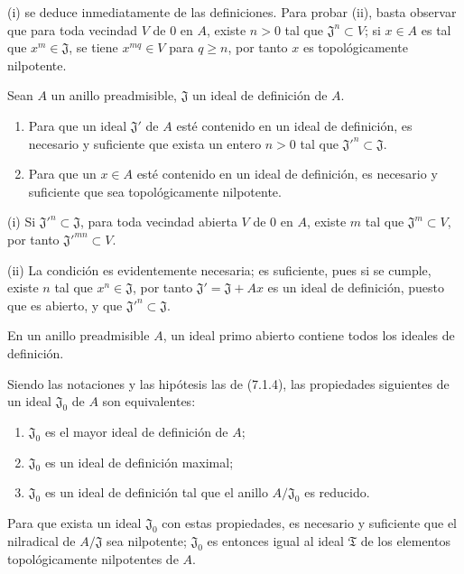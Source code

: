 (i) se deduce inmediatamente de las definiciones. Para probar (ii), basta
observar que para toda vecindad $V$ de $0$ en $A$, existe $n>0$ tal que
$\mathfrak J^n\subset V$; si $x\in A$ es tal que $x^m\in\mathfrak J$, se tiene
$x^{mq}\in V$ para $q\geq n$, por tanto $x$ es topológicamente nilpotente.

\begin{proposition}[7.1.4]
\label{0.7.1.4-fr}
Sean $A$ un anillo preadmisible, $\mathfrak J$ un ideal de definición de
$A$.
\begin{enumerate}
  \item[{\upshape(i)}] Para que un ideal $\mathfrak J'$ de $A$ esté contenido
    en un ideal de definición, es necesario y suficiente que exista un entero
    $n>0$ tal que ${\mathfrak J'}^n\subset\mathfrak J$.
  \item[{\upshape(ii)}] Para que un $x\in A$ esté contenido en un ideal de
    definición, es necesario y suficiente que sea topológicamente nilpotente.
\end{enumerate}
\end{proposition}

(i) Si ${\mathfrak J'}^n\subset\mathfrak J$, para toda vecindad abierta $V$ de
$0$ en $A$, existe $m$ tal que $\mathfrak J^m\subset V$, por tanto
${\mathfrak J'}^{mn}\subset V$.

(ii) La condición es evidentemente necesaria; es suficiente, pues si se
cumple, existe $n$ tal que $x^n\in\mathfrak J$, por tanto
$\mathfrak J'=\mathfrak J+Ax$ es un ideal de definición, puesto que es abierto,
y que ${\mathfrak J'}^n\subset\mathfrak J$.

\begin{corollary}[7.1.5]
\label{0.7.1.5-fr}
En un anillo preadmisible $A$, un ideal primo abierto contiene todos los
ideales de definición.
\end{corollary}

\begin{corollary}[7.1.6]
\label{0.7.1.6-fr}
Siendo las notaciones y las hipótesis las de \textup{(7.1.4)}, las propiedades siguientes
de un ideal $\mathfrak J_0$ de $A$ son equivalentes:
\begin{enumerate}
  \item[$a)$] $\mathfrak J_0$ es el mayor ideal de definición de $A$;
  \item[$b)$] $\mathfrak J_0$ es un ideal de definición maximal;
  \item[$c)$] $\mathfrak J_0$ es un ideal de definición tal que el anillo
    $A/\mathfrak J_0$ es reducido.
\end{enumerate}
Para que exista un ideal $\mathfrak J_0$ con estas propiedades, es necesario y
suficiente que el nilradical de $A/\mathfrak J$ sea nilpotente; $\mathfrak J_0$
es entonces igual al ideal $\mathfrak T$ de los elementos topológicamente nilpotentes
de $A$.
\end{corollary}

